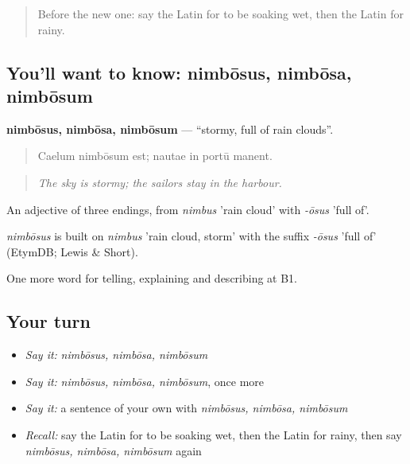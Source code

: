 \label{lesson:LA-C485-nimbosus}



\begin{quote}
Before the new one: say the Latin for to be soaking wet, then the Latin for rainy.
\end{quote}

\subsection*{You'll want to know: nimbōsus, nimbōsa, nimbōsum}
\textbf{nimbōsus, nimbōsa, nimbōsum} — \textquotedblleft{}stormy, full of rain clouds\textquotedblright{}.

\begin{quote}
Caelum nimbōsum est; nautae in portū manent.
\end{quote}

\begin{quote}
\emph{The sky is stormy; the sailors stay in the harbour.}
\end{quote}

An adjective of three endings, from \emph{nimbus} 'rain cloud' with \emph{-ōsus} 'full of'.

\begin{cousinweb}
\emph{nimbōsus} is built on \emph{nimbus} 'rain cloud, storm' with the suffix \emph{-ōsus} 'full of' (EtymDB; Lewis \& Short).
\end{cousinweb}

\begin{grammarlens}[title={What you've built}]
One more word for telling, explaining and describing at B1.
\end{grammarlens}

\subsection*{Your turn}
\begin{itemize}
\raggedright
  \item \emph{Say it:} \emph{nimbōsus, nimbōsa, nimbōsum}
  \item \emph{Say it:} \emph{nimbōsus, nimbōsa, nimbōsum}, once more
  \item \emph{Say it:} a sentence of your own with \emph{nimbōsus, nimbōsa, nimbōsum}
  \item \emph{Recall:} say the Latin for to be soaking wet, then the Latin for rainy, then say \emph{nimbōsus, nimbōsa, nimbōsum} again
\end{itemize}

